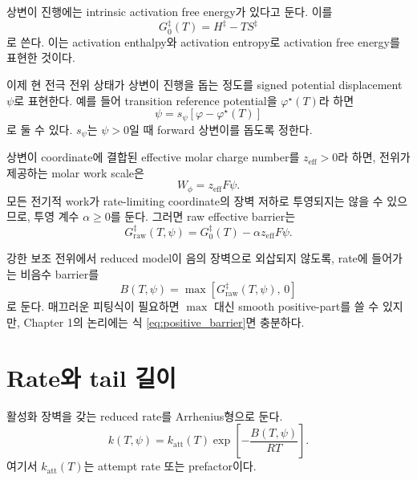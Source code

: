 \documentclass[11pt]{article}
\newcommand{\raw}{\mathrm{raw}}
\newcommand{\att}{\mathrm{att}}
\begin{document}
상변이 진행에는 intrinsic activation free energy가 있다고 둔다. 이를
\begin{equation}
G_0^\ddagger(T)
=
H^\ddagger-T S^\ddagger
\label{eq:intrinsic_barrier}
\end{equation}
로 쓴다. 이는 activation enthalpy와 activation entropy로 activation free energy를 표현한 것이다.

이제 현 전극 전위 상태가 상변이 진행을 돕는 정도를 signed potential displacement \(\psi\)로 표현한다. 예를 들어 transition reference potential을 \(\varphi^\star(T)\)라 하면
\begin{equation}
\psi=s_\psi\left[\varphi-\varphi^\star(T)\right]
\label{eq:psi_def}
\end{equation}
로 둘 수 있다. \(s_\psi\)는 \(\psi>0\)일 때 forward 상변이를 돕도록 정한다.

상변이 coordinate에 결합된 effective molar charge number를 \(z_{\mathrm{eff}}>0\)라 하면, 전위가 제공하는 molar work scale은
\begin{equation}
W_\phi=z_{\mathrm{eff}}F\psi .
\label{eq:potential_work}
\end{equation}
모든 전기적 work가 rate-limiting coordinate의 장벽 저하로 투영되지는 않을 수 있으므로, 투영 계수 \(\alpha\ge0\)를 둔다. 그러면 raw effective barrier는
\begin{equation}
G_{\raw}^\ddagger(T,\psi)
=
G_0^\ddagger(T)
-
\alpha z_{\mathrm{eff}}F\psi .
\label{eq:raw_barrier}
\end{equation}

강한 보조 전위에서 reduced model이 음의 장벽으로 외삽되지 않도록, rate에 들어가는 비음수 barrier를
\begin{equation}
B(T,\psi)
=
\max\!\left[
G_{\raw}^\ddagger(T,\psi),\,0
\right]
\label{eq:positive_barrier}
\end{equation}
로 둔다. 매끄러운 피팅식이 필요하면 \(\max\) 대신 smooth positive-part를 쓸 수 있지만, Chapter 1의 논리에는 식 \eqref{eq:positive_barrier}면 충분하다.

\section{Rate와 tail 길이}

활성화 장벽을 갖는 reduced rate를 Arrhenius형으로 둔다.
\begin{equation}
\boxed{
k(T,\psi)
=
k_{\att}(T)
\exp\!\left[-\frac{B(T,\psi)}{RT}\right].
}
\label{eq:rate_barrier}
\end{equation}
여기서 \(k_{\att}(T)\)는 attempt rate 또는 prefactor이다.
\end{document}
